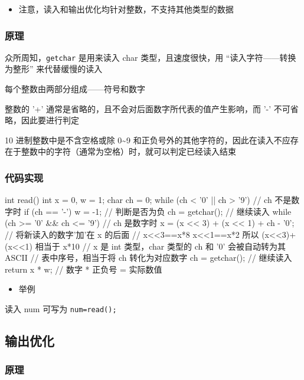 \begin{itemize}
\item 注意，读入和输出优化均针对整数，不支持其他类型的数据
\end{itemize}

\subsubsection{原理}

众所周知，\texttt{getchar} 是用来读入 char 类型，且速度很快，用 “读入字符——转换为整形” 来代替缓慢的读入

每个整数由两部分组成——符号和数字

整数的 '+' 通常是省略的，且不会对后面数字所代表的值产生影响，而 '-' 不可省略，因此要进行判定

10 进制整数中是不含空格或除 0\textasciitilde{}9 和正负号外的其他字符的，因此在读入不应存在于整数中的字符（通常为空格）时，就可以判定已经读入结束

\subsubsection{代码实现}

\begin{cppcode}
int read() {
  int x = 0, w = 1;
  char ch = 0;
  while (ch < '0' || ch > '9') {  // ch 不是数字时
    if (ch == '-') w = -1;        // 判断是否为负
    ch = getchar();               // 继续读入
  }
  while (ch >= '0' && ch <= '9') {  // ch 是数字时
    x = (x << 3) + (x << 1) + ch - '0';  // 将新读入的数字’加’在 x 的后面
    // x<<3==x*8  x<<1==x*2  所以 (x<<3)+(x<<1) 相当于 x*10
    // x 是 int 类型，char 类型的 ch 和 ’0’ 会被自动转为其 ASCII
    // 表中序号，相当于将 ch 转化为对应数字
    ch = getchar();  // 继续读入
  }
  return x * w;  // 数字 * 正负号 = 实际数值
}
\end{cppcode}

\begin{itemize}
\item 举例 
\end{itemize}

读入 num 可写为 \texttt{num=read();}

\subsection{输出优化}

\subsubsection{原理}

